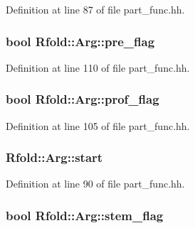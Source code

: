 Definition at line 87 of file part\+\_\+func.\+hh.

\hypertarget{class_rfold_1_1_arg_a8a7ca4df7e6085e8cc4af60917c99a92}{
\subsubsection[{pre\+\_\+flag}]{\setlength{\rightskip}{0pt plus 5cm}bool Rfold\+::\+Arg\+::pre\+\_\+flag}}\label{class_rfold_1_1_arg_a8a7ca4df7e6085e8cc4af60917c99a92}


Definition at line 110 of file part\+\_\+func.\+hh.

\hypertarget{class_rfold_1_1_arg_ada0e4aafdcedc01f9891d523f2626226}{
\subsubsection[{prof\+\_\+flag}]{\setlength{\rightskip}{0pt plus 5cm}bool Rfold\+::\+Arg\+::prof\+\_\+flag}}\label{class_rfold_1_1_arg_ada0e4aafdcedc01f9891d523f2626226}


Definition at line 105 of file part\+\_\+func.\+hh.

\hypertarget{class_rfold_1_1_arg_afe6c58f953e12b4964a7c14b78ee731e}{
\subsubsection[{start}]{ Rfold\+::\+Arg\+::start}}\label{class_rfold_1_1_arg_afe6c58f953e12b4964a7c14b78ee731e}


Definition at line 90 of file part\+\_\+func.\+hh.

\hypertarget{class_rfold_1_1_arg_aa67a67820097b91b6376581ae28ee481}{
\subsubsection[{stem\+\_\+flag}]{\setlength{\rightskip}{0pt plus 5cm}bool Rfold\+::\+Arg\+::stem\+\_\+flag}}\label{class_rfold_1_1_arg_aa67a67820097b91b6376581ae28ee481}


